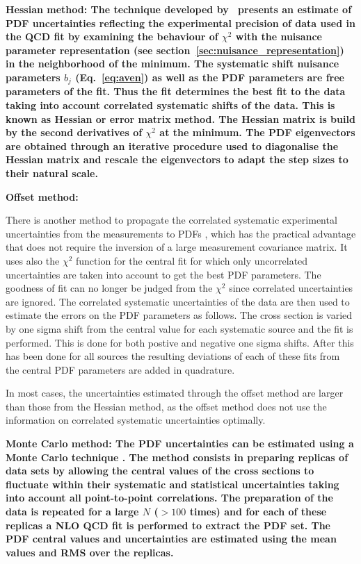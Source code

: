 \begin{description}
\item \bf{Hessian method:} \rm
The technique developed by~\cite{Pumplin:2001ct} presents an estimate of PDF uncertainties 
reflecting the experimental precision of data used in the QCD fit by examining the behaviour 
of $\chi^2$ with the nuisance parameter representation (see section~\ref{sec:nuisance_representation}) in the neighborhood of the minimum. 
The systematic shift nuisance parameters $b_j$ (Eq.~\ref{eq:aven}) as well as the PDF parameters are free parameters of the fit. Thus the fit determines the best fit to the data taking into account correlated systematic shifts of the data. This is known as Hessian or error matrix method. The Hessian matrix is build by the second derivatives of $\chi^2$ at the minimum. The PDF eigenvectors are obtained through an iterative procedure used to diagonalise the Hessian matrix and rescale the eigenvectors to adapt the step sizes to their natural scale.

\item \bf{Offset  method:} \rm

There is another method to propagate the correlated systematic experimental uncertainties from the measurements to PDFs \cite{Botje:2001fx}, which has the practical advantage that does not require the inversion of a large measurement covariance matrix.
%
It uses also the $\chi^2$ function for the central fit for which only
uncorrelated uncertainties are taken into account to get the best PDF parameters. The goodness of fit can no longer be judged from the $\chi^2$ since correlated uncertainties are ignored. 
%
The correlated systematic uncertainties of the data are then used to estimate 
the errors on the PDF parameters as follows.
The cross section is varied by one sigma shift from the central value 
for each systematic source and the fit is performed. 
This is done for both postive and negative one sigma shifts. 
After this has been done for all sources the 
resulting deviations of each of these fits from the central PDF parameters are added in quadrature. 

In most cases, the uncertainties estimated through the offset method are larger than 
those from the Hessian method, as the offset method does not use the information on correlated systematic uncertainties optimally.

\item \bf{Monte Carlo method:} \rm
The PDF uncertainties can be estimated using a Monte Carlo technique \cite{Giele:1998gw, mcmethod2}.
The method consists in preparing replicas of data sets by allowing the central values of the cross sections to 
fluctuate within their systematic and statistical uncertainties taking into account all point-to-point correlations.
The preparation of the data is repeated for a large $N$ ($>100$ times) and for each of these replicas a NLO QCD fit is performed to 
extract the PDF set. The PDF central values and uncertainties are estimated using the mean values and RMS 
over the replicas. 


\end{description}
